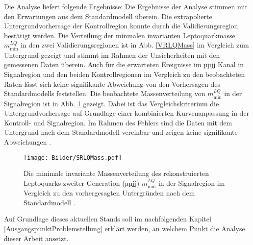 Die Analyse liefert folgende Ergebnisse: Die Ergebnisse der Analyse stimmen mit den Erwartungen aus dem Standardmodell überein. Die extrapolierte Untergrundvorhersage der Kontrollregion konnte durch die Validierungsregion bestätigt werden. Die Verteilung der minmalen invarianten Leptoquarkmasse $m_{\text{min}}^{LQ}$ in den zwei Validierungsregionen ist in Abb. \ref{VRLQMass} im Vergleich zum Untergrund gezeigt und stimmt im Rahmen der Unsicherheiten mit den gemessenen Daten überein. Auch für die erwarteten Ereignisse im µµjj Kanal in Signalregion und den beiden Kontrollregionen im Vergleich zu den beobachteten Raten lässt sich keine signifikante Abweichung von den Vorhersagen des Standardmodells feststellen. Die beobachtete Massenverteilung von $m_{\text{min}}^{LQ}$ in der Signalregion ist in Abb. \ref{SRLQMass} gezeigt. Dabei ist das Vergleichskriterium die Untergrundvorhersage auf Grundlage einer kombinierten Kurvenanpassung in der Kontroll- und Signalregion. Im Rahmen des Fehlers sind die Daten mit dem Untergrund nach dem Standardmodell vereinbar und zeigen keine signifikante Abweichungen \cite{LQATLAS}.%
\begin{figure}[htbp]                                 
  \begin{center}                                       
  \texttt{[image: Bilder/SRLQMass.pdf]} 
   \caption[Die minimale invariante Massenverteilung des rekonstruierten Leptoquarks zweiter Generation in der Signalregion]{Die minimale invariante Massenverteilung des rekonstruierten Leptoquarks zweiter Generation (µµjj) $m_{\text{min}}^{LQ}$ in der Signalregion im Vergleich zu den vorhergesagten Untergründen nach dem Standardmodell \cite{LQATLAS}.}
   \label{SRLQMass}                                     
   \end{center}
\end{figure}
Auf Grundlage dieses aktuellen Stands soll im nachfolgenden Kapitel \ref{AusgangspunktProblemstellung} erklärt werden, an welchem Punkt die Analyse dieser Arbeit an\-setzt. 
